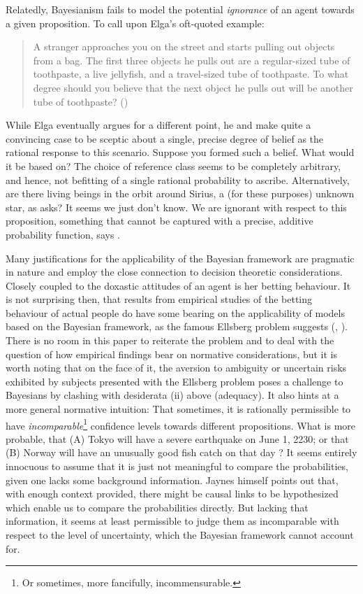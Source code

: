 \documentclass[11pt, a4paper]{scrartcl}
\begin{document}
Relatedly, Bayesianism fails to model the potential \emph{ignorance} of an agent towards a given proposition. To call upon Elga's oft-quoted example:
\begin{quote}
A stranger approaches you on the street and starts pulling out objects from a bag. The first three objects he pulls out are a regular-sized tube of toothpaste, a live jellyfish, and a travel-sized tube of toothpaste. To what degree should you believe that the next object he pulls out will be another tube of toothpaste?
(\citet{Elga2010-ELGSPS})
\end{quote}
While Elga eventually argues for a different point, he and \citet{sep-imprecise-probabilities} make quite a convincing case to be sceptic about a single, precise degree of belief as the rational response to this scenario. Suppose you formed such a belief. What would it be based on? The choice of reference class seems to be completely arbitrary, and hence, not befitting of a single rational probability to ascribe. Alternatively, are there living beings in the orbit around Sirius, a (for these purposes) unknown star, as \citet{Shafer1976-SHAAMT} asks? It seems we just don't know. We are ignorant with respect to this proposition, something that cannot be captured with a precise, additive probability function, says \citet{Norton2011-NORCTB}.

Many justifications for the applicability of the Bayesian framework are pragmatic in nature and employ the close connection to decision theoretic considerations. Closely coupled to the doxastic attitudes of an agent is her betting behaviour. It is not surprising then, that results from empirical studies of the betting behaviour of actual people do have some bearing on the applicability of models based on the Bayesian framework, as the famous Ellsberg problem suggests (\citet{Ellsberg}, \citet{Camerer1992}). There is no room in this paper to reiterate the problem and to deal with the question of how empirical findings bear on normative considerations, but it is worth noting that on the face of it, the aversion to ambiguity or uncertain risks exhibited by subjects presented with the Ellsberg problem poses a challenge to Bayesians by clashing with desiderata (ii) above (adequacy). It also hints at a more general normative intuition: That sometimes, it is rationally permissible to have \emph{incomparable}\footnote{Or sometimes, more fancifully, incommensurable.} confidence levels towards different propositions. What is more probable, that (A) Tokyo will have a severe earthquake on June 1, 2230; or that (B) Norway will have an unusually good fish catch on that day \citep[p.658]{Jaynes2003-JAYPTT}? It seems entirely innocuous to assume that it is just not meaningful to compare the probabilities, given one lacks some background information. Jaynes himself points out that, with enough context provided, there might be causal links to be hypothesized which enable us to compare the probabilities directly. But lacking that information, it seems at least permissible to judge them as incomparable with respect to the level of uncertainty, which the Bayesian framework cannot account for. 
\end{document}
